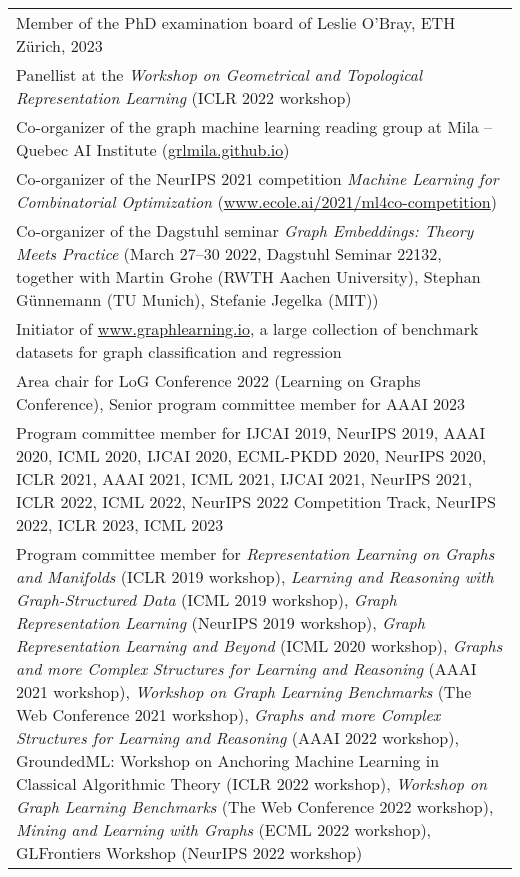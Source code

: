 \documentclass[11pt, a4paper, DIV=12]{scrartcl}
\begin{document}
\begin{tabular}{p{14.5cm}}
	Member of the PhD examination board of Leslie O'Bray, ETH Zürich, 2023 \\[.2em]
	
	Panellist at the \emph{Workshop on Geometrical and Topological Representation Learning} (ICLR 2022 workshop) \\[1.5em]

	Co-organizer of the graph machine learning reading group at Mila -- Quebec AI Institute (\url{grlmila.github.io}) \\[1.5em]

	Co-organizer of the NeurIPS 2021 competition \emph{Machine Learning for Combinatorial Optimization} (\url{www.ecole.ai/2021/ml4co-competition}) \\[1.5em]

	Co-organizer of the Dagstuhl seminar \emph{Graph Embeddings: Theory Meets Practice} (March 27–30 2022, Dagstuhl Seminar 22132, together with Martin Grohe (RWTH Aachen University), Stephan Günnemann (TU Munich), Stefanie Jegelka (MIT)) \\[1.5em]

	Initiator of \url{www.graphlearning.io}, a large collection of benchmark datasets for graph classification and regression \\[1.5em]

	Area chair for LoG Conference 2022 (Learning on Graphs Conference), Senior program committee member for AAAI 2023 \\[1.5em]

	Program committee member for IJCAI 2019, NeurIPS  2019, AAAI 2020, ICML 2020, IJCAI 2020, ECML-PKDD 2020, NeurIPS 2020, ICLR 2021, AAAI 2021, ICML 2021, IJCAI 2021, NeurIPS 2021, ICLR 2022, ICML 2022, NeurIPS 2022 Competition Track, NeurIPS 2022, ICLR 2023, ICML 2023 \\[1.5em]

	Program committee member for \emph{Representation Learning on Graphs and Manifolds} (ICLR 2019 workshop), \emph{Learning and Reasoning with Graph-Structured Data} (ICML 2019 workshop), \emph{Graph Representation Learning} (NeurIPS 2019 workshop), \emph{Graph Representation Learning and Beyond} (ICML 2020 workshop), \emph{Graphs and more Complex Structures for Learning and Reasoning} (AAAI 2021 workshop), \emph{Workshop on Graph Learning Benchmarks} (The Web Conference 2021 workshop),  \emph{Graphs and more Complex Structures for Learning and Reasoning} (AAAI 2022 workshop), GroundedML: Workshop on Anchoring Machine Learning in Classical Algorithmic Theory (ICLR 2022 workshop), \emph{Workshop on Graph Learning Benchmarks} (The Web Conference 2022 workshop), \emph{Mining and Learning with Graphs} (ECML 2022 workshop), GLFrontiers Workshop (NeurIPS 2022 workshop) \\[1.5em]


\end{tabular}
\end{document}
